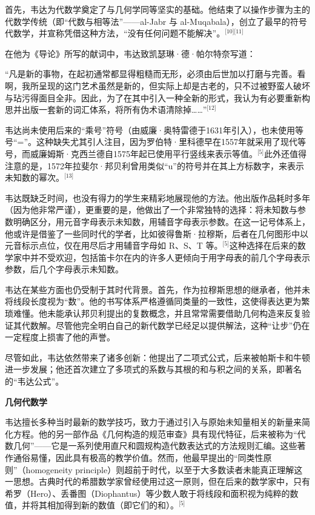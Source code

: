 首先，韦达为代数学奠定了与几何学同等坚实的基础。他结束了以操作步骤为主的代数学传统（即“代数与相等法”——al-Jabr 与 al-Muqabala），创立了最早的符号代数学，并宣称凭借这种方法，“没有任何问题不能解决”。\(^\text{[10][11]}\)

在他为《导论》所写的献词中，韦达致凯瑟琳·德·帕尔特奈写道：

“凡是新的事物，在起初通常都显得粗糙而无形，必须由后世加以打磨与完善。看啊，我所呈现的这门艺术虽然是新的，但实际上却是古老的，只不过被野蛮人破坏与玷污得面目全非。因此，为了在其中引入一种全新的形式，我认为有必要重新构思并出版一套新的词汇体系，将所有伪术语清除掉……”\(^\text{[12]}\)

韦达尚未使用后来的“乘号”符号（由威廉·奥特雷德于1631年引入），也未使用等号“=”。这种缺失尤其引人注目，因为罗伯特·里科德早在1557年就采用了现代等号，而威廉姆斯·克西兰德自1575年起已使用平行竖线来表示等值。\(^\text{[5]}\)此外还值得注意的是，1572年拉斐尔·邦贝利曾用类似“u”的符号并在其上方标数字，来表示未知数的幂次。\(^\text{[13]}\)

韦达既缺乏时间，也没有得力的学生来精彩地展现他的方法。他出版作品耗时多年（因为他非常严谨），更重要的是，他做出了一个非常独特的选择：将未知数与参数明确区分，用元音字母表示未知数，用辅音字母表示参数。在这一记号体系上，他或许是借鉴了一些同时代的学者，比如彼得鲁斯·拉穆斯，后者在几何图形中以元音标示点位，仅在用尽后才用辅音字母如 R、S、T 等。\(^\text{[5]}\)这种选择在后来的数学家中并不受欢迎，包括笛卡尔在内的许多人更倾向于用字母表的前几个字母表示参数，后几个字母表示未知数。

韦达在某些方面也仍受制于其时代背景。首先，作为拉穆斯思想的继承者，他并未将线段长度视为“数”。他的书写体系严格遵循同类量的一致性，这使得表达更为繁琐难懂。他未能承认邦贝利提出的复数概念，并且常常需要借助几何构造来反复验证其代数解。尽管他完全明白自己的新代数学已经足以提供解法，这种“让步”仍在一定程度上损害了他的声誉。

尽管如此，韦达依然带来了诸多创新：他提出了二项式公式，后来被帕斯卡和牛顿进一步发展；他还首次建立了多项式的系数与其根的和与积之间的关系，即著名的“韦达公式”。

\textbf{几何代数学}

韦达擅长多种当时最新的数学技巧，致力于通过引入与原始未知量相关的新量来简化方程。他的另一部作品《几何构造的规范审查》具有现代特征，后来被称为“代数几何”——它是一系列使用直尺和圆规构造代数表达式的方法规则汇编。这些著作通俗易懂，因此具有极高的教学价值。然而，他最早提出的“同类性原则”（homogeneity principle）则超前于时代，以至于大多数读者未能真正理解这一思想。古典时代的希腊数学家曾经使用过这一原则，但在后来的数学家中，只有希罗（Hero）、丢番图（Diophantus）等少数人敢于将线段和面积视为纯粹的数值，并将其相加得到新的数值（即它们的和）。\(^\text{[5]}\)

